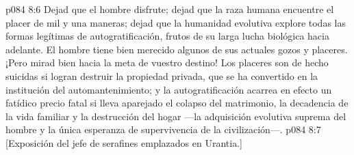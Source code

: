 \vs p084 8:6 \pc Dejad que el hombre disfrute; dejad que la raza humana encuentre el placer de mil y una maneras; dejad que la humanidad evolutiva explore todas las formas legítimas de autogratificación, frutos de su larga lucha biológica hacia adelante. El hombre tiene bien merecido algunos de sus actuales gozos y placeres. ¡Pero mirad bien hacia la meta de vuestro destino! Los placeres son de hecho suicidas si logran destruir la propiedad privada, que se ha convertido en la institución del automantenimiento; y la autogratificación acarrea en efecto un fatídico precio fatal si lleva aparejado el colapso del matrimonio, la decadencia de la vida familiar y la destrucción del hogar ---la adquisición evolutiva suprema del hombre y la única esperanza de supervivencia de la civilización---.
\vsetoff
\vs p084 8:7 [Exposición del jefe de serafines emplazados en Urantia.]
